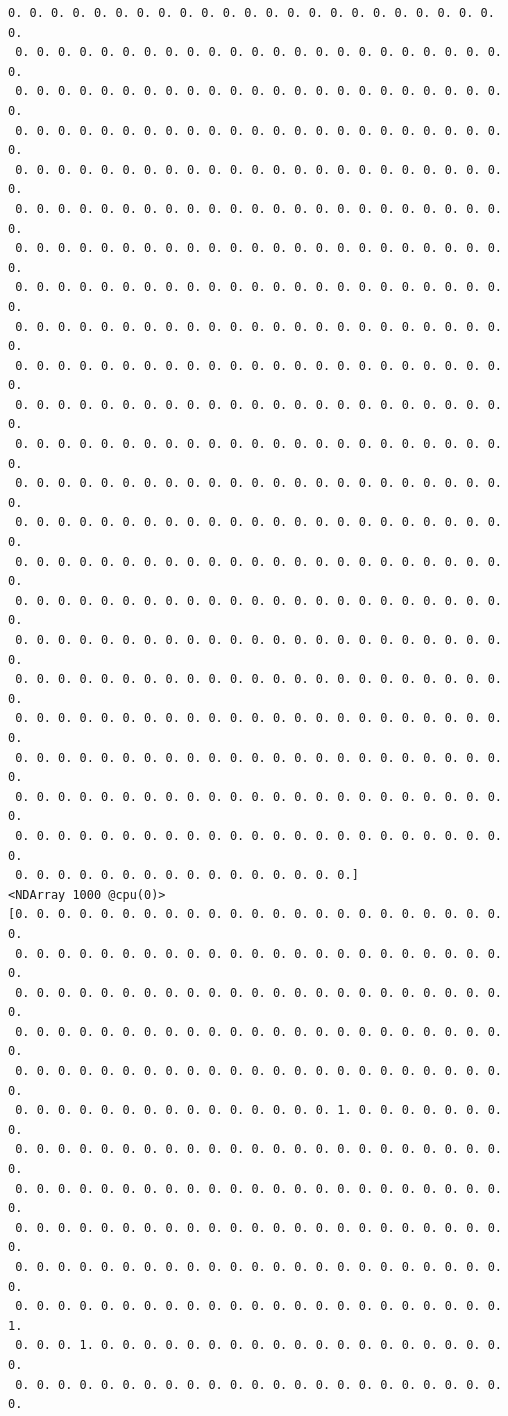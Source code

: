 \documentclass[11pt]{article}
\begin{document}
\begin{Verbatim}[commandchars=\\\{\}]
 0. 0. 0. 0. 0. 0. 0. 0. 0. 0. 0. 0. 0. 0. 0. 0. 0. 0. 0. 0. 0. 0. 0. 0.
 0. 0. 0. 0. 0. 0. 0. 0. 0. 0. 0. 0. 0. 0. 0. 0. 0. 0. 0. 0. 0. 0. 0. 0.
 0. 0. 0. 0. 0. 0. 0. 0. 0. 0. 0. 0. 0. 0. 0. 0. 0. 0. 0. 0. 0. 0. 0. 0.
 0. 0. 0. 0. 0. 0. 0. 0. 0. 0. 0. 0. 0. 0. 0. 0. 0. 0. 0. 0. 0. 0. 0. 0.
 0. 0. 0. 0. 0. 0. 0. 0. 0. 0. 0. 0. 0. 0. 0. 0. 0. 0. 0. 0. 0. 0. 0. 0.
 0. 0. 0. 0. 0. 0. 0. 0. 0. 0. 0. 0. 0. 0. 0. 0. 0. 0. 0. 0. 0. 0. 0. 0.
 0. 0. 0. 0. 0. 0. 0. 0. 0. 0. 0. 0. 0. 0. 0. 0. 0. 0. 0. 0. 0. 0. 0. 0.
 0. 0. 0. 0. 0. 0. 0. 0. 0. 0. 0. 0. 0. 0. 0. 0. 0. 0. 0. 0. 0. 0. 0. 0.
 0. 0. 0. 0. 0. 0. 0. 0. 0. 0. 0. 0. 0. 0. 0. 0. 0. 0. 0. 0. 0. 0. 0. 0.
 0. 0. 0. 0. 0. 0. 0. 0. 0. 0. 0. 0. 0. 0. 0. 0. 0. 0. 0. 0. 0. 0. 0. 0.
 0. 0. 0. 0. 0. 0. 0. 0. 0. 0. 0. 0. 0. 0. 0. 0. 0. 0. 0. 0. 0. 0. 0. 0.
 0. 0. 0. 0. 0. 0. 0. 0. 0. 0. 0. 0. 0. 0. 0. 0. 0. 0. 0. 0. 0. 0. 0. 0.
 0. 0. 0. 0. 0. 0. 0. 0. 0. 0. 0. 0. 0. 0. 0. 0. 0. 0. 0. 0. 0. 0. 0. 0.
 0. 0. 0. 0. 0. 0. 0. 0. 0. 0. 0. 0. 0. 0. 0. 0. 0. 0. 0. 0. 0. 0. 0. 0.
 0. 0. 0. 0. 0. 0. 0. 0. 0. 0. 0. 0. 0. 0. 0. 0. 0. 0. 0. 0. 0. 0. 0. 0.
 0. 0. 0. 0. 0. 0. 0. 0. 0. 0. 0. 0. 0. 0. 0. 0. 0. 0. 0. 0. 0. 0. 0. 0.
 0. 0. 0. 0. 0. 0. 0. 0. 0. 0. 0. 0. 0. 0. 0. 0. 0. 0. 0. 0. 0. 0. 0. 0.
 0. 0. 0. 0. 0. 0. 0. 0. 0. 0. 0. 0. 0. 0. 0. 0. 0. 0. 0. 0. 0. 0. 0. 0.
 0. 0. 0. 0. 0. 0. 0. 0. 0. 0. 0. 0. 0. 0. 0. 0. 0. 0. 0. 0. 0. 0. 0. 0.
 0. 0. 0. 0. 0. 0. 0. 0. 0. 0. 0. 0. 0. 0. 0. 0. 0. 0. 0. 0. 0. 0. 0. 0.
 0. 0. 0. 0. 0. 0. 0. 0. 0. 0. 0. 0. 0. 0. 0. 0. 0. 0. 0. 0. 0. 0. 0. 0.
 0. 0. 0. 0. 0. 0. 0. 0. 0. 0. 0. 0. 0. 0. 0. 0. 0. 0. 0. 0. 0. 0. 0. 0.
 0. 0. 0. 0. 0. 0. 0. 0. 0. 0. 0. 0. 0. 0. 0. 0.]
<NDArray 1000 @cpu(0)> 
[0. 0. 0. 0. 0. 0. 0. 0. 0. 0. 0. 0. 0. 0. 0. 0. 0. 0. 0. 0. 0. 0. 0. 0.
 0. 0. 0. 0. 0. 0. 0. 0. 0. 0. 0. 0. 0. 0. 0. 0. 0. 0. 0. 0. 0. 0. 0. 0.
 0. 0. 0. 0. 0. 0. 0. 0. 0. 0. 0. 0. 0. 0. 0. 0. 0. 0. 0. 0. 0. 0. 0. 0.
 0. 0. 0. 0. 0. 0. 0. 0. 0. 0. 0. 0. 0. 0. 0. 0. 0. 0. 0. 0. 0. 0. 0. 0.
 0. 0. 0. 0. 0. 0. 0. 0. 0. 0. 0. 0. 0. 0. 0. 0. 0. 0. 0. 0. 0. 0. 0. 0.
 0. 0. 0. 0. 0. 0. 0. 0. 0. 0. 0. 0. 0. 0. 0. 1. 0. 0. 0. 0. 0. 0. 0. 0.
 0. 0. 0. 0. 0. 0. 0. 0. 0. 0. 0. 0. 0. 0. 0. 0. 0. 0. 0. 0. 0. 0. 0. 0.
 0. 0. 0. 0. 0. 0. 0. 0. 0. 0. 0. 0. 0. 0. 0. 0. 0. 0. 0. 0. 0. 0. 0. 0.
 0. 0. 0. 0. 0. 0. 0. 0. 0. 0. 0. 0. 0. 0. 0. 0. 0. 0. 0. 0. 0. 0. 0. 0.
 0. 0. 0. 0. 0. 0. 0. 0. 0. 0. 0. 0. 0. 0. 0. 0. 0. 0. 0. 0. 0. 0. 0. 0.
 0. 0. 0. 0. 0. 0. 0. 0. 0. 0. 0. 0. 0. 0. 0. 0. 0. 0. 0. 0. 0. 0. 0. 1.
 0. 0. 0. 1. 0. 0. 0. 0. 0. 0. 0. 0. 0. 0. 0. 0. 0. 0. 0. 0. 0. 0. 0. 0.
 0. 0. 0. 0. 0. 0. 0. 0. 0. 0. 0. 0. 0. 0. 0. 0. 0. 0. 0. 0. 0. 0. 0. 0.

\end{Verbatim}
\end{document}
